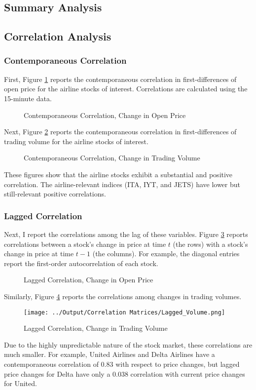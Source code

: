 \documentclass[12pt]{article}
\begin{document}
\subsection{Summary Analysis}
\subsection{Correlation Analysis}
\subsubsection{Contemporaneous Correlation}
First, Figure \ref{fig:contemp_open} reports the contemporaneous correlation in first-differences of open price for the airline stocks of interest. Correlations are calculated using the 15-minute data.
\begin{figure}[H]
    \centering
    \caption{Contemporaneous Correlation, Change in Open Price}
    \label{fig:contemp_open}
\end{figure}
Next, Figure \ref{fig:contemp_vol} reports the contemporaneous correlation in first-differences of trading volume for the airline stocks of interest.
\begin{figure}[H]
    \centering
    \caption{Contemporaneous Correlation, Change in Trading Volume}
    \label{fig:contemp_vol}
\end{figure}
These figures show that the airline stocks exhibit a substantial and positive correlation. The airline-relevant indices (ITA, IYT, and JETS) have lower but still-relevant positive correlations. 

\subsubsection{Lagged Correlation}
Next, I report the correlations among the lag of these variables. Figure \ref{fig:lagged_open} reports correlations between a stock's change in price at time $t$ (the rows) with a stock's change in price at time $t-1$ (the columns). For example, the diagonal entries report the first-order autocorrelation of each stock.
\begin{figure}[H]
    \centering
    \caption{Lagged Correlation, Change in Open Price}
    \label{fig:lagged_open}
\end{figure}
Similarly, Figure \ref{fig:lagged_volume} reports the correlations among changes in trading volumes.
\begin{figure}[H]
    \centering
    \caption{Lagged Correlation, Change in Trading Volume}
    \texttt{[image: ../Output/Correlation Matrices/Lagged\_Volume.png]}
    \label{fig:lagged_volume}
\end{figure}
Due to the highly unpredictable nature of the stock market, these correlations are much smaller. For example, United Airlines and Delta Airlines have a contemporaneous correlation of 0.83 with respect to price changes, but lagged price changes for Delta have only a 0.038 correlation with current price changes for United.
\end{document}
